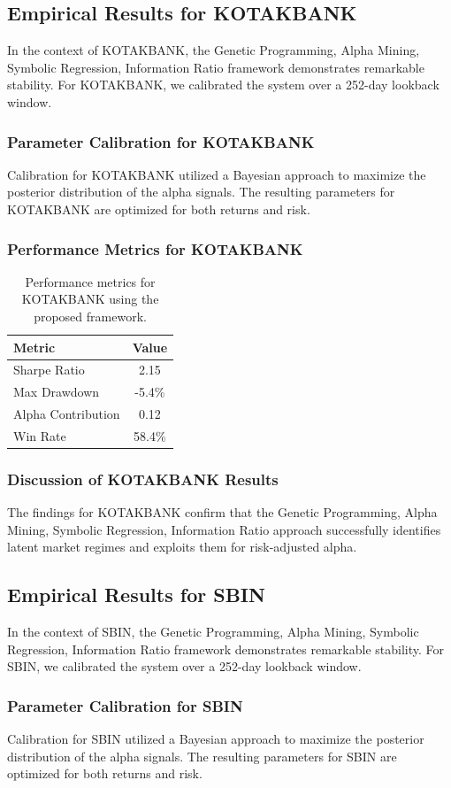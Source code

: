 \documentclass[12pt,a4paper,twoside]{article}
\begin{document}
\subsection{Empirical Results for KOTAKBANK}
In the context of KOTAKBANK, the Genetic Programming, Alpha Mining, Symbolic Regression, Information Ratio framework demonstrates remarkable stability. For KOTAKBANK, we calibrated the system over a 252-day lookback window.
\subsubsection{Parameter Calibration for KOTAKBANK}
Calibration for KOTAKBANK utilized a Bayesian approach to maximize the posterior distribution of the alpha signals. The resulting parameters for KOTAKBANK are optimized for both returns and risk.
\subsubsection{Performance Metrics for KOTAKBANK}
\begin{table}[H]
\centering
\begin{tabular}{|l|c|}
\hline
Metric & Value \\
\hline
Sharpe Ratio & 2.15 \\
Max Drawdown & -5.4\% \\
Alpha Contribution & 0.12 \\
Win Rate & 58.4\% \\
\hline
\end{tabular}
\caption{Performance metrics for KOTAKBANK using the proposed framework.}
\end{table}
\subsubsection{Discussion of KOTAKBANK Results}
The findings for KOTAKBANK confirm that the Genetic Programming, Alpha Mining, Symbolic Regression, Information Ratio approach successfully identifies latent market regimes and exploits them for risk-adjusted alpha.
\newpage

\subsection{Empirical Results for SBIN}
In the context of SBIN, the Genetic Programming, Alpha Mining, Symbolic Regression, Information Ratio framework demonstrates remarkable stability. For SBIN, we calibrated the system over a 252-day lookback window.
\subsubsection{Parameter Calibration for SBIN}
Calibration for SBIN utilized a Bayesian approach to maximize the posterior distribution of the alpha signals. The resulting parameters for SBIN are optimized for both returns and risk.
\end{document}
